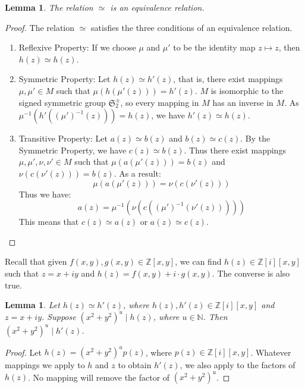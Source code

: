 \documentclass[12pt]{article}
\newtheorem{lemma}[theorem]{Lemma}
\theoremstyle{definition}
\theoremstyle{remark}
\newcommand{\Nnn}{\mathbb N}
\newcommand{\Zzz}{\mathbb Z}
\newcommand{\divides}{\mid}
\numberwithin{equation}{section}
\begin{document}
\begin{lemma}
The relation \( \simeq \) is an equivalence relation.
\end{lemma}

\begin{proof}
The relation \( \simeq \) satisfies the three conditions of an equivalence relation.
\begin{enumerate}
\item Reflexive Property: If we choose \( \mu \) and \( \mu'\) to be the identity map \( z \mapsto z \), 
then \( h(z) \simeq h(z) \).

\item Symmetric Property: Let  \( h(z) \simeq h'(z) \), that is, there exist mappings 
\( \mu, \mu' \in M \)
such that \( \mu( h( \mu'( z ) ) )  = h'(z) \).
\(M\) is isomorphic to the signed symmetric group \( \mathfrak{S}_2^\pm \), so every mapping in \(M\)
has an inverse in \(M\). As  \( \mu^{-1}( h'( (\mu')^{-1}( z ) ) )  = h(z) \),
we have \( h'(z) \simeq h(z) \).

\item Transitive Property: Let \( a(z) \simeq b(z) \) and \( b(z) \simeq c(z) \). By the 
Symmetric Property, we have \( c(z) \simeq b(z) \). Thus there exist mappings
\( \mu, \mu', \nu, \nu' \in M \) such that \( \mu( a( \mu'( z ) ) )  = b(z) \) and 
\( \nu( c( \nu'( z ) ) )  = b(z) \). As a result:
\[
\mu( a( \mu'( z ) ) ) = \nu( c( \nu'( z ) ) )  
\]
Thus we have: 
\[
a(  z  ) = \mu^{-1}( \nu( c( (\mu')^{-1}( \nu'( z ) ) ) ) )
\]
This means that \( c(z) \simeq a(z) \) or \( a(z) \simeq c(z) \).
\end{enumerate}
\end{proof}

Recall that given \( f(x,y), g(x,y) \in \Zzz[x,y] \),
we can find \( h(z) \in \Zzz [i][x,y] \)
such that
\( z = x + iy \)
and
\( h(z) = f(x,y) + i \cdot g(x,y) \). 
The converse is also true.


\begin{lemma}
Let \( h(z) \simeq h'(z) \), where \( h(z), h'(z) \in \Zzz[i][x,y] \)
and \( z = x+ iy \).
Suppose \( ( x^2 + y^2 ) ^ u \divides h(z) \),
where \( u \in \Nnn \). Then \( ( x^2 + y^2 ) ^ u \divides h'(z) \).
\end{lemma}
   
\begin{proof}
Let \( h(z) = ( x^2 + y^2 ) ^ u  p(z) \), where \( p(z) \in \Zzz [i][x,y] \). 
Whatever mappings we apply to \(h\) and \(z\)
to obtain \( h'(z) \), we also apply to the factors of \( h(z) \). 
No mapping will remove the factor of \( ( x^2 + y^2 ) ^ u \).

\end{proof}
\end{document}
